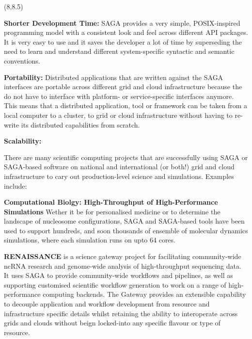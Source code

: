 \documentclass[a0b,portrait]{a0poster}
\def\LHead#1{\bigskip\bigskip\noindent{\huge\color{HeadColor} #1}\smallskip}
\begin{document}
\begin{textblock}{7}(8,8.5)

\LHead{Why Use SAGA ?}
\large 

\textbf{\color{DarkBlue} Shorter Development Time:} SAGA provides a very
simple, POSIX-inspired programming model with a consistent look and feel
across different API packages. It is very easy to use and
it saves the developer a lot of time by superseding the need to learn and
understand different system-specific syntactic and semantic conventions.

\textbf{\color{DarkBlue} Portability:} Distributed applications that are
written against the SAGA interfaces are portable across different grid and
cloud infrastructure because the do not have to interface with platform- or
service-specific interfaces anymore. This means that a distributed
application, tool or framework can be taken from a local computer to a
cluster, to grid or cloud infrastructure without having to re-write its
distributed capabilities from scratch. 

\textbf{\color{DarkBlue} Scalability:}

\large


\LHead{How SAGA is Used}
\large

There are many scientific computing projects that are successfully using SAGA
or SAGA-based software on national and international (or both!) grid and cloud
infrastructure to cary out production-level science and simulations. Examples 
include:

\textbf{\color{DarkBlue} Computational Biolgy: High-Throughput of
  High-Performance Simulations} Wether it be for personalised medicine
or to determine the landscape of nucleosome configurations, SAGA and
SAGA-based tools have been used to support hundreds, and soon
thousands of ensemble of molecular dynamics simulations, where each
simulation runs on upto 64 cores.

\textbf{\color{DarkBlue} RENAISSANCE} is a science gateway project for
facilitating community-wide ncRNA research and genome-wide analysis of
high-throughput sequencing data. It uses SAGA to provide
community-wide workflows and pipelines, as well as supporting
customised scientific workflow generation to work on a range of
high-performance computing backends. The Gateway provides an
extensible capability to decouple application and workflow development
from resource and infrastructure specific details whilst retaining the
ability to interoperate across grids and clouds without beign
locked-into any specific flavour or type of resource.


\end{textblock}
\end{document}
